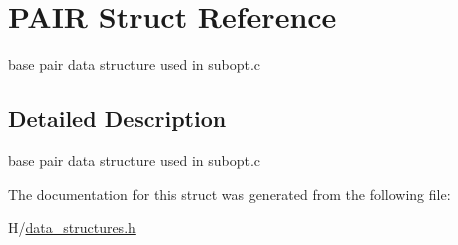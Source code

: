 \hypertarget{structPAIR}{
\section{PAIR Struct Reference}
\label{structPAIR}
}


base pair data structure used in subopt.c  




\subsection{Detailed Description}
base pair data structure used in subopt.c 

The documentation for this struct was generated from the following file:\begin{DoxyCompactItemize}
\item 
H/\hyperlink{data__structures_8h}{data\_\-structures.h}\end{DoxyCompactItemize}
